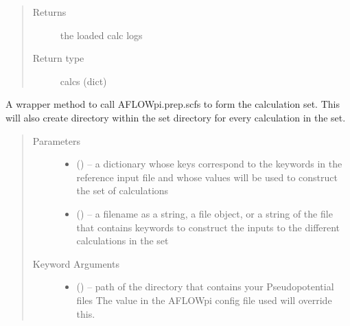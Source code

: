 \documentclass[letterpaper,10pt,english]{sphinxmanual}
\begin{document}
\begin{fulllineitems}
\begin{fulllineitems}
\begin{quote}
\begin{description}
\item[{Returns}] \leavevmode
the loaded calc logs

\item[{Return type}] \leavevmode
calcs (dict)

\end{description}\end{quote}

\end{fulllineitems}


\begin{fulllineitems}
\label{\detokenize{prep:prep.init.scfs}}
A wrapper method to call AFLOWpi.prep.scfs to form the calculation set. This will
also create directory within the set directory for every calculation in the set.
\begin{quote}\begin{description}
\item[{Parameters}] \leavevmode\begin{itemize}
\item {} 
 () -- a dictionary whose keys correspond to the keywords in the
reference input file and whose values will be used to
construct the set of calculations

\item {} 
 () -- a filename as a string, a file object, or a string of the file
that contains keywords to construct the inputs to the different
calculations in the set

\end{itemize}

\item[{Keyword Arguments}] \leavevmode\begin{itemize}
\item {} 
 () -- path of the directory that contains your Pseudopotential files
The value in the AFLOWpi config file used will override this.


\end{itemize}
\end{description}
\end{quote}
\end{fulllineitems}
\end{fulllineitems}
\end{document}
